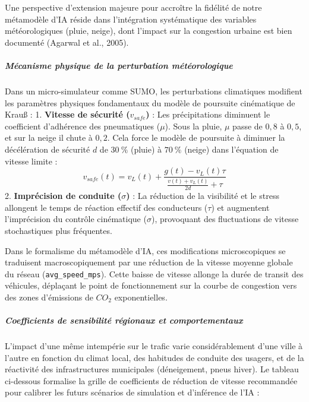 \documentclass[10pt, a4paper]{article}
\begin{document}
Une perspective d'extension majeure pour accroître la fidélité de notre
métamodèle d'IA réside dans l'intégration systématique des variables
météorologiques (pluie, neige), dont l'impact sur la congestion urbaine
est bien documenté (Agarwal et al., 2005).

\subparagraph{Mécanisme physique de la perturbation
météorologique}\label{muxe9canisme-physique-de-la-perturbation-muxe9tuxe9orologique}

Dans un micro-simulateur comme SUMO, les perturbations climatiques
modifient les paramètres physiques fondamentaux du modèle de poursuite
cinématique de Krauß : 1. \textbf{Vitesse de sécurité (\(v_{safe}\))} :
Les précipitations diminuent le coefficient d'adhérence des pneumatiques
(\(\mu\)). Sous la pluie, \(\mu\) passe de \(0,8\) à \(0,5\), et sur la
neige il chute à \(0,2\). Cela force le modèle de poursuite à diminuer
la décélération de sécurité \(d\) de \(30\ \%\) (pluie) à \(70\ \%\)
(neige) dans l'équation de vitesse limite :
\[v_{safe}(t) = v_L(t) + \frac{g(t) - v_L(t)\tau}{\frac{v(t) + v_L(t)}{2d} + \tau}\]
2. \textbf{Imprécision de conduite (\(\sigma\))} : La réduction de la
visibilité et le stress allongent le temps de réaction effectif des
conducteurs (\(\tau\)) et augmentent l'imprécision du contrôle
cinématique (\(\sigma\)), provoquant des fluctuations de vitesse
stochastiques plus fréquentes.

Dans le formalisme du métamodèle d'IA, ces modifications microscopiques
se traduisent macroscopiquement par une réduction de la vitesse moyenne
globale du réseau (\texttt{avg\_speed\_mps}). Cette baisse de vitesse
allonge la durée de transit des véhicules, déplaçant le point de
fonctionnement sur la courbe de congestion vers des zones d'émissions de
\(CO_2\) exponentielles.

\subparagraph{Coefficients de sensibilité régionaux et
comportementaux}\label{coefficients-de-sensibilituxe9-ruxe9gionaux-et-comportementaux}

L'impact d'une même intempérie sur le trafic varie considérablement
d'une ville à l'autre en fonction du climat local, des habitudes de
conduite des usagers, et de la réactivité des infrastructures
municipales (déneigement, pneus hiver). Le tableau ci-dessous formalise
la grille de coefficients de réduction de vitesse recommandée pour
calibrer les futurs scénarios de simulation et d'inférence de l'IA :
\end{document}
